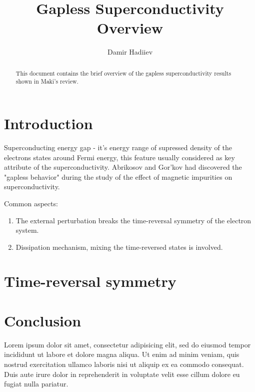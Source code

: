 \documentclass{article}
\begin{document}
\title{Gapless Superconductivity Overview}
\author{Damir Hadiiev}

\maketitle

\begin{abstract}
This document contains the brief overview of the gapless superconductivity results
shown in Maki's review.
\end{abstract}



\section{Introduction}

Superconducting energy gap - it's energy range of supressed density of the electrons
states around Fermi energy, this feature usually considered as key attribute of 
the superconductivity. Abrikosov and Gor'kov had discovered the "gapless behavior"
during the study of the effect of magnetic impurities on superconductivity.

Common aspects:
\begin{enumerate}
\item The external perturbation breaks the time-reversal symmetry of the electron system.
\item Dissipation mechanism, mixing the time-reversed states is involved.
\end{enumerate}

\section{Time-reversal symmetry}

\section{Conclusion}

Lorem ipsum dolor sit amet, consectetur adipisicing elit, sed do eiusmod tempor
incididunt ut labore et dolore magna aliqua. Ut enim ad minim veniam, quis
nostrud exercitation ullamco laboris nisi ut aliquip ex ea commodo consequat.
Duis aute irure dolor in reprehenderit in voluptate velit esse cillum dolore eu
fugiat nulla pariatur.
\end{document}
